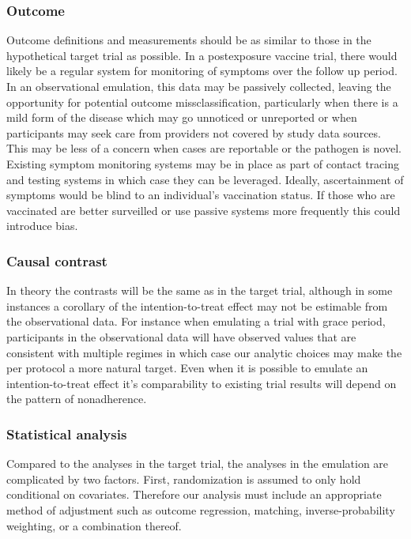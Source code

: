 \documentclass[11pt]{article}
\begin{document}
\subsubsection*{Outcome}
Outcome definitions and measurements should be as similar to those in the hypothetical target trial as possible. In a postexposure vaccine trial, there would likely be a regular system for monitoring of symptoms over the follow up period. In an observational emulation, this data may be passively collected, leaving the opportunity for potential outcome missclassification, particularly when there is a mild form of the disease which may go unnoticed or unreported or when participants may seek care from providers not covered by study data sources. This may be less of a concern when cases are reportable or the pathogen is novel. Existing symptom monitoring systems may be in place as part of contact tracing and testing systems in which case they can be leveraged. Ideally, ascertainment of symptoms would be blind to an individual's vaccination status. If those who are vaccinated are better surveilled or use passive systems more frequently this could introduce bias.

\subsubsection*{Causal contrast}
In theory the contrasts will be the same as in the target trial, although in some instances a corollary of the intention-to-treat effect may not be estimable from the observational data. For instance when emulating a trial with grace period, participants in the observational data will have observed values that are consistent with multiple regimes in which case our analytic choices may make the per protocol a more natural target. Even when it is possible to emulate an intention-to-treat effect it's comparability to existing trial results will depend on the pattern of nonadherence.

\subsubsection*{Statistical analysis}
Compared to the analyses in the target trial, the analyses in the emulation are complicated by two factors. First, randomization is assumed to only hold conditional on covariates. Therefore our analysis must include an appropriate method of adjustment such as outcome regression, matching, inverse-probability weighting, or a combination thereof. 
\end{document}
